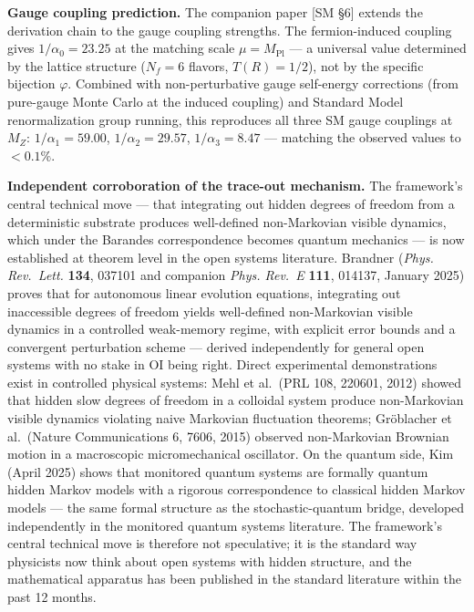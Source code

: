 \documentclass[
]{article}
\begin{document}
\textbf{Gauge coupling prediction.} The companion paper {[}SM §6{]}
extends the derivation chain to the gauge coupling strengths. The
fermion-induced coupling gives \(1/\alpha_0 = 23.25\) at the matching
scale \(\mu = M_{\text{Pl}}\) --- a universal value determined by the
lattice structure (\(N_f = 6\) flavors, \(T(R) = 1/2\)), not by the
specific bijection \(\varphi\). Combined with non-perturbative gauge
self-energy corrections (from pure-gauge Monte Carlo at the induced
coupling) and Standard Model renormalization group running, this
reproduces all three SM gauge couplings at \(M_Z\):
\(1/\alpha_1 = 59.00\), \(1/\alpha_2 = 29.57\), \(1/\alpha_3 = 8.47\)
--- matching the observed values to \(< 0.1\%\).

\textbf{Independent corroboration of the trace-out mechanism.} The
framework's central technical move --- that integrating out hidden
degrees of freedom from a deterministic substrate produces well-defined
non-Markovian visible dynamics, which under the Barandes correspondence
becomes quantum mechanics --- is now established at theorem level in the
open systems literature. Brandner (\emph{Phys. Rev.~Lett.} \textbf{134},
037101 and companion \emph{Phys. Rev.~E} \textbf{111}, 014137, January
2025) proves that for autonomous linear evolution equations, integrating
out inaccessible degrees of freedom yields well-defined non-Markovian
visible dynamics in a controlled weak-memory regime, with explicit error
bounds and a convergent perturbation scheme --- derived independently
for general open systems with no stake in OI being right. Direct
experimental demonstrations exist in controlled physical systems: Mehl
et al.~(PRL 108, 220601, 2012) showed that hidden slow degrees of
freedom in a colloidal system produce non-Markovian visible dynamics
violating naive Markovian fluctuation theorems; Gröblacher et
al.~(Nature Communications 6, 7606, 2015) observed non-Markovian
Brownian motion in a macroscopic micromechanical oscillator. On the
quantum side, Kim (April 2025) shows that monitored quantum systems are
formally quantum hidden Markov models with a rigorous correspondence to
classical hidden Markov models --- the same formal structure as the
stochastic-quantum bridge, developed independently in the monitored
quantum systems literature. The framework's central technical move is
therefore not speculative; it is the standard way physicists now think
about open systems with hidden structure, and the mathematical apparatus
has been published in the standard literature within the past 12 months.
\end{document}
